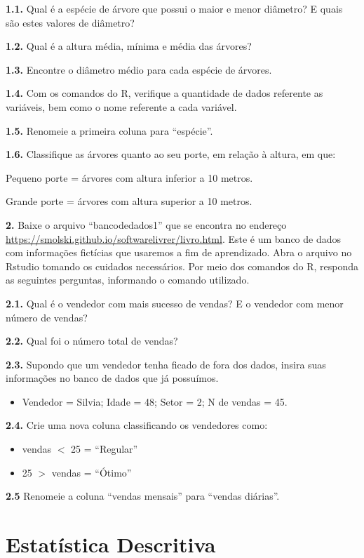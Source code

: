 \documentclass[12pt,brazil,oneside]{book}
\providecommand{\tightlist}{%
  \setlength{\itemsep}{0pt}\setlength{\parskip}{0pt}}
\begin{document}
\textbf{1.1.} Qual é a espécie de árvore que possui o maior e menor diâmetro? E quais são estes valores de diâmetro?

\textbf{1.2.} Qual é a altura média, mínima e média das árvores?

\textbf{1.3.} Encontre o diâmetro médio para cada espécie de árvores.

\textbf{1.4.} Com os comandos do R, verifique a quantidade de dados referente as variáveis, bem como o nome referente a cada variável.

\textbf{1.5.} Renomeie a primeira coluna para ``espécie''.

\textbf{1.6.} Classifique as árvores quanto ao seu porte, em relação à altura, em que:

Pequeno porte = árvores com altura inferior a 10 metros.

Grande porte = árvores com altura superior a 10 metros.

\textbf{2.} Baixe o arquivo ``bancodedados1'' que se encontra no endereço \url{https://smolski.github.io/softwarelivrer/livro.html}. Este é um banco de dados com informações fictícias que usaremos a fim de aprendizado. Abra o arquivo no Rstudio tomando os cuidados necessários. Por meio dos comandos do R, responda as seguintes perguntas, informando o comando utilizado.

\textbf{2.1.} Qual é o vendedor com mais sucesso de vendas? E o vendedor com menor número de vendas?

\textbf{2.2.} Qual foi o número total de vendas?

\textbf{2.3.} Supondo que um vendedor tenha ficado de fora dos dados, insira suas informações no banco de dados que já possuímos.

\begin{itemize}
\tightlist
\item
  Vendedor = Silvia; Idade = 48; Setor = 2; N de vendas = 45.
\end{itemize}

\textbf{2.4.} Crie uma nova coluna classificando os vendedores como:

\begin{itemize}
\item
  vendas \(<\) 25 = ``Regular''
\item
  25 \(>\) vendas = ``Ótimo''
\end{itemize}

\textbf{2.5} Renomeie a coluna ``vendas mensais'' para ``vendas diárias''.

\hypertarget{desc}{%
\chapter{Estatística Descritiva}\label{desc}}
\end{document}
